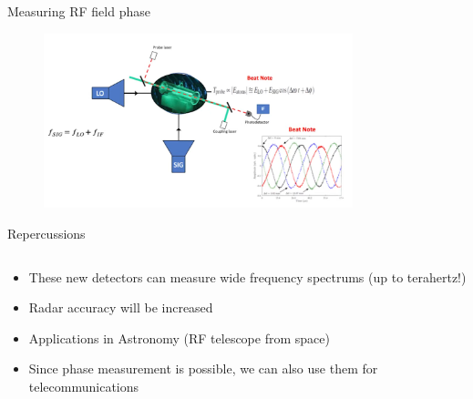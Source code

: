 \begin{frame}{Measuring RF field phase}
    \begin{figure}
        \centering
        \includegraphics[width=0.8\textwidth]{images/rydberg_phase_measurement.png}
    \end{figure}
\end{frame}

\begin{columnframe}{Repercussions}
    \begin{column}{0.9\textwidth}
        \begin{itemize}
            \item These new detectors can measure wide frequency spectrums (up to terahertz!)
            \item Radar accuracy will be increased
            \item Applications in Astronomy (RF telescope from space)
            \item Since phase measurement is possible, we can also use them for telecommunications
        \end{itemize}
    \end{column}
\end{columnframe}

